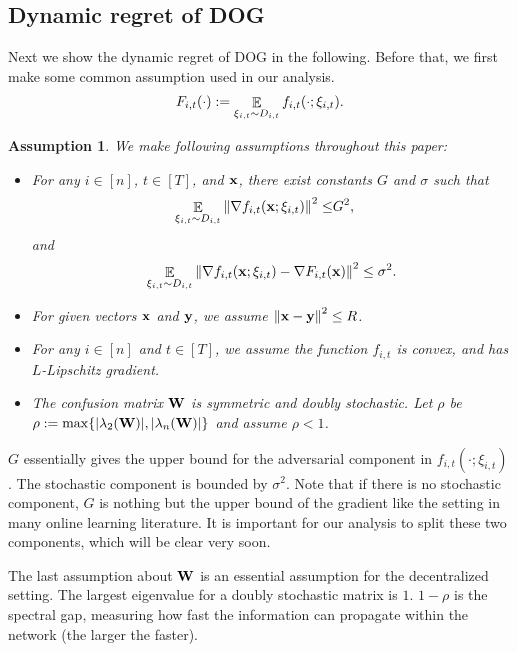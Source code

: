\documentclass{article}
\newtheorem{Assumption}{\bf{Assumption}}
\begin{document}
\subsection{Dynamic regret of DOG}
\label{subsection_theoretical_analysis}
Next we show the dynamic regret of DOG in the following. Before that, we first make some common assumption used in our analysis. 
\begin{align}
\nonumber
F_{i,t}(\cdot) := \mathop{\mathbb{E}}_{\xi_{i,t} \sim D_{i,t}} f_{i,t}(\cdot; \xi_{i,t}).
\end{align}

\begin{Assumption}
\label{assumption_bounded_gradient_domain}
We make following assumptions throughout this paper:
\begin{itemize}
\item For any $i\in[n]$, $t\in[T]$, and ${\bf x}$, there exist constants $G$ and $\sigma$ such that
\begin{align}
\nonumber
\mathop{\mathbb{E}}_{ \xi_{i,t} \sim D_{i,t} }\left\lVert\nabla f_{i,t}({\bf x};\xi_{i,t})\right\rVert^2 \le &  G^2,
\end{align} and 
\begin{align}
\nonumber
\mathop{\mathbb{E}}_{ \xi_{i,t} \sim D_{i,t} } \left\lVert\nabla f_{i,t}({\bf x}; \xi_{i,t}) - \nabla F_{i,t}({\bf x})\right\rVert^2 \le \sigma^2.
\end{align}
\item For given vectors ${\bf x}$ and ${\bf y}$, we assume $\left\lVert{\bf x}-{\bf y}\right\rVert^2 \le R$.
\item  For any $i\in[n]$ and $t\in[T]$, we assume the function $f_{i,t}$ is convex, and has $L$-Lipschitz gradient. 
\item The confusion matrix ${\bf W}$ is symmetric and doubly stochastic. Let $\rho$ be $\rho := \max\{ |\lambda_2({\bf W})|, |\lambda_n({\bf W})| \}$ and assume $\rho <1$.
\end{itemize}
\end{Assumption}
$G$ essentially gives the upper bound for the adversarial component in $f_{i,t}(\cdot; \xi_{i,t})$. The stochastic component is bounded by $\sigma^2$. Note that if there is no stochastic component, $G$ is nothing but the upper bound of the gradient like the setting in many online learning literature. It is important for our analysis to split these two components, which will be clear very soon. 

The last assumption about ${\bf W}$ is an essential assumption for the decentralized setting. The largest eigenvalue for a doubly stochastic matrix is $1$. $1-\rho$ is the spectral gap, measuring how fast the information can propagate within the network (the larger the faster). 
\end{document}

